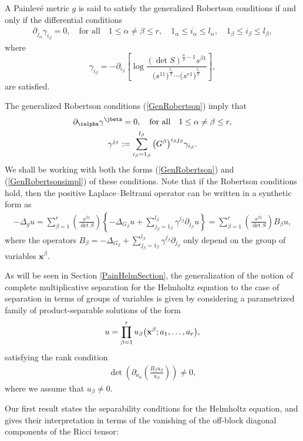 \begin{Definition} \label{defiRC}
A Painlev\'e metric $g$ is said to satisfy the generalized Robertson conditions if and only if the differential conditions
	\begin{gather}\label{GenRobertson}
\partial_{j_{\alpha}}\gamma_{i_{\beta}}=0,\quad \textrm{for all} \quad 1\leq \alpha \neq \beta \leq r, \quad 1_{\alpha}\leq i_{\alpha} \leq l_{\alpha},\quad 1_{\beta}\leq i_{\beta} \leq l_{\beta},
\end{gather}
where
\[
\gamma_{i_{\beta}}=-\partial_{i_{\beta}}\left[\log \frac{(\det S)^{\frac{n}{2}-1}s^{\beta 1}}{\big(s^{11}\big)^{\frac{l_1}{2}} \cdots \big(s^{r1}\big)^{\frac{l_r}{2}}}\right],
\]
are satisfied.
\end{Definition}
The generalized Robertson conditions (\ref{GenRobertson}) imply that
\begin{gather}\label{GenRobertsonsimpl}
\partial_{\ialpha}\gamma^{\jbeta}=0, \quad \textrm{for all} \quad 1\leq \alpha \neq \beta \leq r,\\
\label{gammaup}
\gamma^{j_{\beta}}:= \sum_{i_{\beta}=1_{\beta}}^{l_{\beta}}\big(G^{\beta}\big)^{i_{\beta}j_{\beta}} \gamma_{i_{\beta}}.
\end{gather}
We shall be working with both the forms (\ref{GenRobertson}) and (\ref{GenRobertsonsimpl}) of these conditions. Note that if the Robertson conditions hold, then the positive Laplace--Beltrami operator can be written in a synthetic form as
\begin{gather*}%
 -\Delta_{g} u  =   \sum_{\beta=1}^{r} \left(\frac{s^{\beta 1}}{\det S}\right)\left\{-\Delta_{G_{\beta}}u + \sum_{{j}_{\beta}=1_{\beta}}^{l_{\beta}} \gamma^{j_{\beta}} \partial_{j_{\beta}}u\right\}
   =   \sum_{\beta=1}^{r} \left(\frac{s^{\beta 1}}{\det S}\right) B_\beta u , \nonumber
\end{gather*}
where the operators $B_\beta = -\Delta_{G_{\beta}} + \sum\limits_{{j}_{\beta}=1_{\beta}}^{l_{\beta}} \gamma^{j_{\beta}} \partial_{j_{\beta}}$ only depend on the group of variables $\textbf{x}^\beta$.

As will be seen in Section \ref{PainHelmSection}, the generalization of the notion of complete multiplicative separation for the Helmholtz equation to the case of separation in terms of groups of variables is given by considering a parametrized family of product-separable solutions of the form
\begin{gather} \label{SeparabilitySchro}
u=\prod_{\beta =1}^{r}u_{\beta}\big({\bf x}^{\beta};a_{1},\dots,a_{r}\big),
\end{gather}
satisfying the rank condition
\begin{gather} \label{RankPainSchro}
 \det  \left( \partial_{a_\alpha} \left( \frac{B_\beta u_\beta}{u_\beta} \right) \right) \ne 0,
\end{gather}
where we assume that $u_{\beta}\neq 0$.

Our first result states the separability conditions for the Helmholtz equation, and gives their interpretation in terms of the vanishing of the off-block diagonal components of the Ricci tensor:

